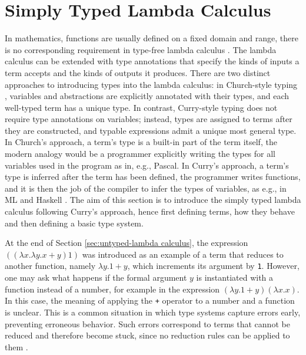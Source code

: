\section{Simply Typed Lambda Calculus}\label{sec:typed-lambda calculus}
In mathematics, functions are usually defined on a fixed domain and range, there is no corresponding requirement in type-free lambda calculus \cite{Srensen2007-SRELOT}. The lambda calculus can be extended with type annotations that specify the kinds of inputs a term accepts and the kinds of outputs it produces. There are two distinct approaches to introducing types into the lambda calculus: in Church-style typing \cite{Church_1940}, variables and abstractions are explicitly annotated with their types, and each well-typed term has a unique type. In contrast, Curry-style typing \cite{functionality_in_combinatory_logic} does not require type annotations on variables; instead, types are assigned to terms after they are constructed, and typable expressions admit a unique most general type. In Church’s approach, a term’s type is a built-in part of the term itself, the modern analogy would be a programmer explicitly writing the types for all variables used in the program as in, e.g., Pascal. In Curry’s approach, a term’s type is inferred after the term has been defined, the programmer writes functions, and it is then the job of the compiler to infer the types of variables, as e.g., in ML and Haskell \cite{Raamsdonk2009LambdaCalculusAC, Srensen2007-SRELOT}. The aim of this section is to introduce the simply typed lambda calculus following Curry's approach, hence first defining terms, how they behave and then defining a basic type system. 

At the end of Section \ref{sec:untyped-lambda calculus}, the expression $((\lambda x.\lambda y.x+y)1)$ was introduced as an example of a term that reduces to another function, namely $\lambda y.1+y$, which increments its argument by \verb|1|. However, one may ask what happens if the formal argument $y$ is instantiated with a function instead of a number, for example in the expression $(\lambda y.1+y)(\lambda x.x)$. In this case, the meaning of applying the \verb|+| operator to a number and a function is unclear. This is a common situation in which type systems capture errors early, preventing erroneous behavior. Such errors correspond to terms that cannot be reduced and therefore become stuck, since no reduction rules can be applied to them \cite{types-and-programming-languages}.

